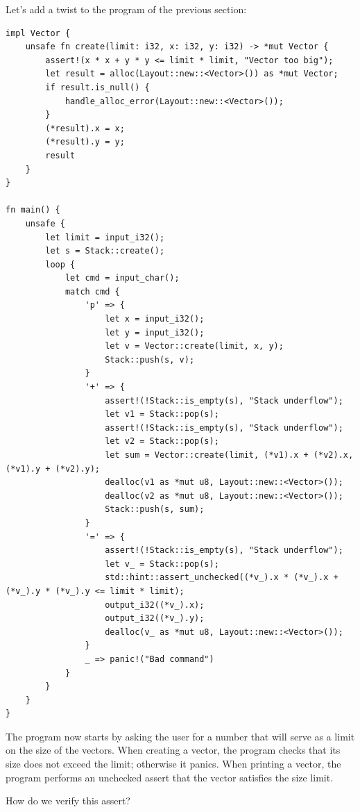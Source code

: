 \documentclass{article}
\begin{document}
Let's add a twist to the program of the previous section:
\begin{lstlisting}
impl Vector {
    unsafe fn create(limit: i32, x: i32, y: i32) -> *mut Vector {
        assert!(x * x + y * y <= limit * limit, "Vector too big");
        let result = alloc(Layout::new::<Vector>()) as *mut Vector;
        if result.is_null() {
            handle_alloc_error(Layout::new::<Vector>());
        }
        (*result).x = x;
        (*result).y = y;
        result
    }
}

fn main() {
    unsafe {
        let limit = input_i32();
        let s = Stack::create();
        loop {
            let cmd = input_char();
            match cmd {
                'p' => {
                    let x = input_i32();
                    let y = input_i32();
                    let v = Vector::create(limit, x, y);
                    Stack::push(s, v);
                }
                '+' => {
                    assert!(!Stack::is_empty(s), "Stack underflow");
                    let v1 = Stack::pop(s);
                    assert!(!Stack::is_empty(s), "Stack underflow");
                    let v2 = Stack::pop(s);
                    let sum = Vector::create(limit, (*v1).x + (*v2).x, (*v1).y + (*v2).y);
                    dealloc(v1 as *mut u8, Layout::new::<Vector>());
                    dealloc(v2 as *mut u8, Layout::new::<Vector>());
                    Stack::push(s, sum);
                }
                '=' => {
                    assert!(!Stack::is_empty(s), "Stack underflow");
                    let v_ = Stack::pop(s);
                    std::hint::assert_unchecked((*v_).x * (*v_).x + (*v_).y * (*v_).y <= limit * limit);
                    output_i32((*v_).x);
                    output_i32((*v_).y);
                    dealloc(v_ as *mut u8, Layout::new::<Vector>());
                }
                _ => panic!("Bad command")
            }
        }
    }
}
\end{lstlisting}
The program now starts by asking the user for a number that
will serve as a limit on the size of the vectors. When creating
a vector, the program checks that its size does not exceed the
limit; otherwise it panics. When printing a vector, the program
performs an unchecked assert that the vector satisfies the size limit.

How do we verify this assert?
\end{document}
